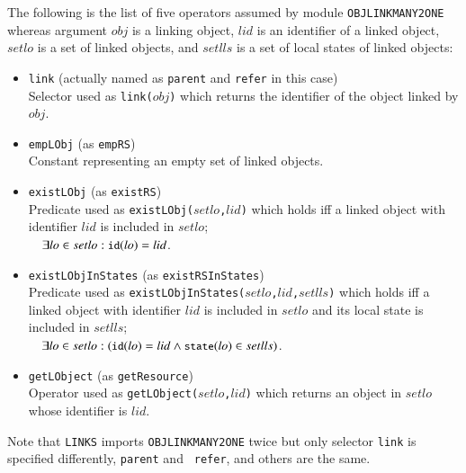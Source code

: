 \documentclass[12pt]{report}
\newcommand{\mbstt}[1]{\mbox{\small{\tt {#1}}}}
\newcommand{\stt}[1]{{\small{\tt {#1}}}}
\begin{document}
The following is the list of five operators assumed by
module {\tt OBJLINKMANY2ONE} whereas argument $\mathit{obj}$ is a linking
object, $lid$ is an identifier of a linked object, $setlo$ is a set of
linked objects, and $setlls$ is a set of local states of linked
objects:
\begin{itemize}
\item \stt{link} (actually named as \stt{parent} and \stt{refer} in this case)\\
  Selector used as \stt{link($\mathit{obj}$)} which returns the identifier of
  the object linked by $\mathit{obj}$.
\item \stt{empLObj} (as \stt{empRS})\\
  Constant representing an empty set of linked objects.
\item \stt{existLObj} (as \stt{existRS})\\
  Predicate used as \stt{existLObj($setlo$,$lid$)} which holds iff a
  linked object with identifier $lid$ is included in
  $setlo$;\\$~~~~\exists lo\in setlo:\mbstt{id}(lo)=lid$.
\item \stt{existLObjInStates} (as \stt{existRSInStates})\\
  Predicate used as \stt{existLObjInStates($setlo$,$lid$,$setlls$)}
  which holds iff a linked object with identifier $lid$ is included
  in $setlo$ and its local state is included in
  $setlls$;\\$~~~~\exists lo\in setlo:(\mbstt{id}(lo)=lid\land
  \mbstt{state}(lo)\in setlls)$.
\item \stt{getLObject} (as \stt{getResource})\\
  Operator used as \stt{getLObject($setlo$,$lid$)} which returns an
  object in $setlo$ whose identifier is $lid$.
\end{itemize}
Note that {\tt LINKS} imports {\tt OBJLINKMANY2ONE} twice but only
selector {\tt link} is specified differently, {\tt parent} and {\tt
  refer}, and others are the same.
\end{document}
